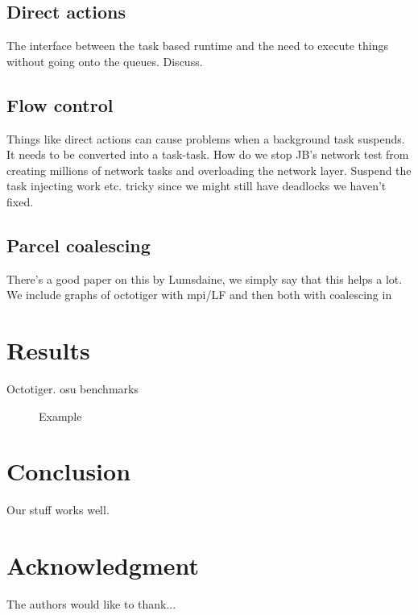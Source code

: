 \subsection{Direct actions}
The interface between the task based runtime and the need to execute things without going onto the queues.
Discuss.

\subsection{Flow control}
Things like direct actions can cause problems when a background task suspends. It needs to be
converted into a task-task. 
How do we stop JB's network test from creating millions of network tasks and overloading the network layer. 
Suspend the task injecting work etc. tricky since we might still have deadlocks we haven't fixed.

\subsection{Parcel coalescing}
There's a good paper on this by Lumsdaine, we simply say that this helps a lot.
We include graphs of octotiger with mpi/LF and then both with coalescing in


\section{Results}
Octotiger. osu benchmarks

\begin{figure*}[ht]
  \def\svgwidth{\columnwidth}
  \resizebox{0.99\textwidth}{!}
    {}
  \caption{Example} 
  \label{fig:octotiger-parcelports}
\end{figure*}



\section{Conclusion}
Our stuff works well.


\section*{Acknowledgment}
The authors would like to thank...
